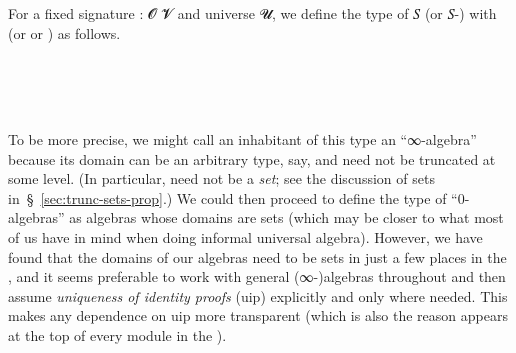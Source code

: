 For a fixed signature  \as :  \ab 𝓞 \ab 𝓥 and universe \ab 𝓤, we define the type of  \ab 𝑆 (or \ab 𝑆-) with  (or  or )  as follows.
\ccpad
\begin{code}%
\>[0]\AgdaSpace{}%
\AgdaSymbol{:}\AgdaSpace{}%
\AgdaSymbol{(}\AgdaSpace{}%
\AgdaSymbol{:}\AgdaSpace{}%
\AgdaSymbol{)(}\AgdaSpace{}%
\AgdaSymbol{:}\AgdaSpace{}%
\AgdaSpace{}%
\AgdaSpace{}%
\AgdaSymbol{)}\AgdaSpace{}%
\AgdaSpace{}%
\AgdaSpace{}%
\AgdaSpace{}%
\AgdaSpace{}%
\AgdaSpace{}%
\AgdaSpace{}%
\AgdaSpace{}%
\<%
\\
%
\\[\AgdaEmptyExtraSkip]%
\>[0]\AgdaSpace{}%
\AgdaSpace{}%
\AgdaSpace{}%
\AgdaSymbol{=}%
\>[29I]\AgdaSpace{}%
\AgdaSpace{}%
\AgdaSpace{}%
\AgdaSpace{}%
\AgdaSpace{}%
\AgdaFunction{,}%
\>[50]\<%
\\
\>[.][@{}l@{}]\<[29I]%
\>[14]\AgdaSpace{}%
\AgdaSpace{}%
\AgdaSpace{}%
\AgdaSpace{}%
\AgdaSpace{}%
\AgdaSpace{}%
\AgdaFunction{,}\AgdaSpace{}%
\AgdaSpace{}%
\AgdaSymbol{(}\AgdaSpace{}%
\AgdaSpace{}%
\AgdaSpace{}%
\AgdaSymbol{)}\AgdaSpace{}%
%
\>[50]\<%
\end{code}
\ccpad
To be more precise, we might call an inhabitant of this type an ``∞-algebra'' because its domain can be an arbitrary type, say,  and need not be truncated at some level. (In particular,  need not be a \emph{set}; see the discussion of sets in~\S~\ref{sec:trunc-sets-prop}.) We could then proceed to define the type of ``0-algebras'' as algebras whose domains are sets (which may be closer to what most of us have in mind when doing informal universal algebra). However, we have found that the domains of our algebras need to be sets in just a few places in the \ualib, and it seems preferable to work with general (∞-)algebras throughout and then assume \emph{uniqueness of identity proofs} (uip) explicitly and only where needed.  This makes any dependence on uip more transparent (which is also the reason  appears at the top of every module in the \ualib).

